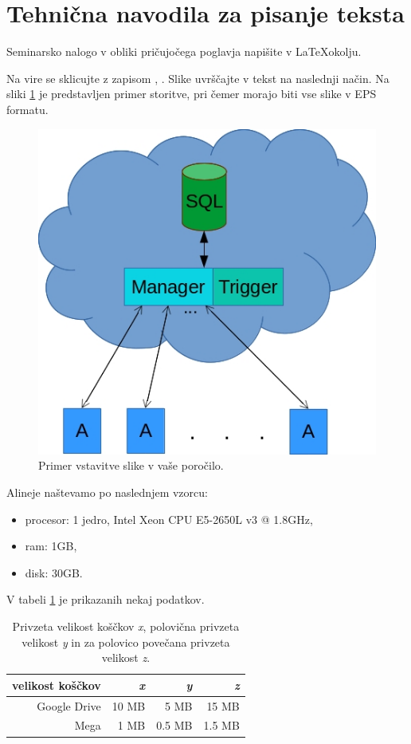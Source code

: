 \section{Tehnična navodila za pisanje teksta}
Seminarsko nalogo v obliki pričujočega poglavja napišite v \LaTeX okolju.

Na vire se sklicujte z zapisom \cite{1_dOcean}, \cite{1_greenwade93}. Slike uvrščajte v tekst na naslednji način. Na sliki \ref{fig:1_osnovnaShema} je predstavljen primer storitve, pri čemer morajo biti vse slike v EPS formatu.
\begin{figure}[H]
    \centering
    \includegraphics[scale=0.75]{Img/1_shema.jpg}
    \caption{Primer vstavitve slike v vaše poročilo.}
    \label{fig:1_osnovnaShema}
\end{figure}

Alineje naštevamo po naslednjem vzorcu:
\begin{itemize}
\item procesor: 1 jedro, Intel Xeon CPU E5-2650L v3 @ 1.8GHz,
\item ram: 1GB,
\item disk: 30GB.
\end{itemize}


V tabeli \ref{table:1_chunks} je prikazanih nekaj podatkov.
\begin{table}[H]
    \centering
        \begin{tabular}{ | r | r | r | r |} 
            \hline
           velikost koščkov & \textit{x} & \textit{y} & \textit{z} \\
            \hline
            Google Drive & 10 MB & 5 MB & 15 MB \\
            Mega & 1 MB & 0.5 MB & 1.5 MB \\
            \hline
        \end{tabular}
        \caption{Privzeta velikost koščkov \textit{x}, polovična privzeta velikost \textit{y} in za polovico povečana privzeta velikost \textit{z}.}
    \label{table:1_chunks}
\end{table}

